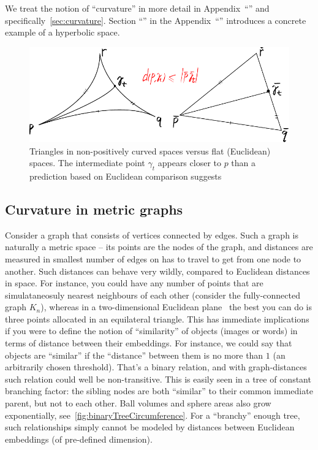 We treat the notion of ``curvature'' in more detail in
Appendix~``'' and specifically~\autoref{sec:curvature}.
Section ``'' in the
Appendix~``'' introduces a concrete example of a
hyperbolic space.

\begin{figure}[ht]\center
    \includegraphics[width=.9\textwidth]{art/npc-comparison-triangle.pdf}
    \caption{Triangles in non-positively curved spaces versus flat (Euclidean) spaces.
    The intermediate point \( \gamma_t \) appears closer to \( p \)
    than a prediction based on Euclidean comparison suggests}
    \label{fig:npcSpaces}
\end{figure}

\subsection*{Curvature in metric graphs}

Consider a graph that consists of vertices connected by edges. Such a graph is
naturally
a metric space -- its points are the nodes of the graph, and distances are
measured in smallest number of edges on has to travel to get from one node to
another.  Such distances can behave very wildly, compared to Euclidean
distances in
space. For instance, you could have any number of points that are
simulataneosuly nearest neighbours of each other (consider the fully-connected
graph \( K_n \)), whereas in a two-dimensional Euclidean
plane~\cite{howManyNeighbours} the best you can do is three points allocated in
an equilateral triangle. This has immediate implications if you were to define
the notion of ``similarity'' of objects (images or words) in terms of distance
between their embeddings.  For instance, we could say that objects are
``similar'' if the ``distance'' between them is no more than \( 1 \) (an
arbitrarily chosen threshold).  That's a binary relation, and with
graph-distances such relation could well be non-transitive. This is easily seen
in a tree of constant branching factor: the sibling nodes are both ``similar''
to their common immediate parent, but not to each other. Ball volumes and
sphere areas also grow exponentially, see~\autoref{fig:binaryTreeCircumference}.
For a ``branchy'' enough tree, such relationships simply cannot be modeled by
distances between Euclidean embeddings (of pre-defined dimension).

